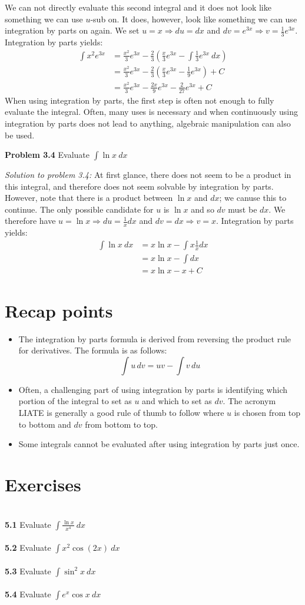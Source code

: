 \documentclass[11pt]{scrartcl}
\begin{document}
We can not directly evaluate this second integral and it does not look like something we can use $u$-sub on. It does, however, look like something we can use integration by parts on again. We set $u=x \Rightarrow du=dx$ and $dv=e^{3x} \Rightarrow v=\frac{1}{3}e^{3x}$. Integration by parts yields:
\begin{align*}
    \int{x^2e^{3x}} &=\frac{x^2}{3}e^{3x}-\frac{2}{3}\left(\frac{x}{3}e^{3x}-\int{\frac{1}{3}e^{3x} \ dx}\right) \\
    &=\frac{x^2}{3}e^{3x}-\frac{2}{3}\left(\frac{x}{3}e^{3x}-\frac{1}{9}e^{3x}\right)+C \\
    &=\frac{x^2}{3}e^{3x}-\frac{2x}{9}e^{3x}-\frac{2}{27}e^{3x}+C
\end{align*}
\noindent 
When using integration by parts, the first step is often not enough to fully evaluate the integral. Often, many uses is necessary and when continuously using integration by parts does not lead to anything, algebraic manipulation can also be used. 
\begin{tcolorbox}[colback=purple!5!white,colframe=purple!75!black]
\textbf{Problem 3.4} Evaluate $\int{\ln x \ dx}$
\end{tcolorbox}
\noindent 
\textit{Solution to problem 3.4:} At first glance, there does not seem to be a product in this integral, and therefore does not seem solvable by integration by parts. However, note that there is a product between $\ln x$ and $dx$; we canuse this to continue. The only possible candidate for $u$ is $\ln x$ and so $dv$ must be $dx$. We therefore have $u=\ln x \Rightarrow du=\frac{1}{x}dx$ and $dv=dx \Rightarrow v=x$. Integration by parts yields:
\begin{align*}
    \int{\ln x \ dx} &=x \ln x-\int{x\frac{1}{x}dx} \\
                     &=x \ln x-\int{dx} \\
                     &=x \ln x-x+C
\end{align*}
\section{Recap points}
\begin{itemize}
    \item The integration by parts formula is derived from reversing the product rule for derivatives. The formula is as follows: 
    $$\int u \, dv=uv-\int v \, du$$ 
    \item Often, a challenging part of using integration by parts is identifying which portion of the integral to set as $u$ and which to set as $dv$. The acronym LIATE is generally a good rule of thumb to follow where $u$ is chosen from top to bottom and $dv$ from bottom to top. 
    \item Some integrals cannot be evaluated after using integration by parts just once. 
\end{itemize}
\section{Exercises}\\
\noindent 
\textbf{5.1} Evaluate $\int{\frac{\ln x}{x^4} \ dx}$ \\
\\
\noindent 
\textbf{5.2} Evaluate $\int{x^2} \cos {(2x)} \ dx$ \\
\\
\noindent 
\textbf{5.3} Evaluate $\int{\sin^2 x} \ dx$ \\
\\
\noindent 
\textbf{5.4} Evaluate $\int {e^x \cos x} \ dx$
\end{document}
